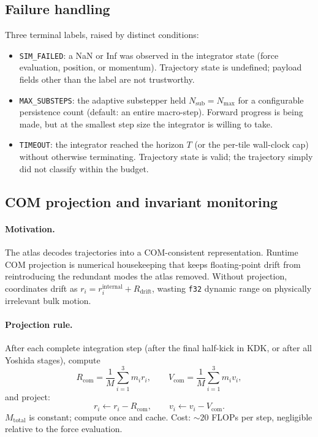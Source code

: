 \documentclass[11pt]{report}
\begin{document}
\subsection{Failure handling}

Three terminal labels, raised by distinct conditions:
\begin{itemize}[nosep]
\item \texttt{SIM\_FAILED}: a NaN or Inf was observed in the integrator state (force evaluation, position, or momentum). Trajectory state is undefined; payload fields other than the label are not trustworthy.
\item \texttt{MAX\_SUBSTEPS}: the adaptive substepper held $N_{\mathrm{sub}}=N_{\max}$ for a configurable persistence count (default: an entire macro-step). Forward progress is being made, but at the smallest step size the integrator is willing to take.
\item \texttt{TIMEOUT}: the integrator reached the horizon $T$ (or the per-tile wall-clock cap) without otherwise terminating. Trajectory state is valid; the trajectory simply did not classify within the budget.
\end{itemize}

\subsection{COM projection and invariant monitoring}
\label{sec:com_projection}

\paragraph{Motivation.} The atlas decodes trajectories into a COM-consistent representation. Runtime COM projection is numerical housekeeping that keeps floating-point drift from reintroducing the redundant modes the atlas removed. Without projection, coordinates drift as $r_i = r_i^{\text{internal}} + R_{\text{drift}}$, wasting \texttt{f32} dynamic range on physically irrelevant bulk motion.

\paragraph{Projection rule.} After each complete integration step (after the final half-kick in KDK, or after all Yoshida stages), compute
\[
R_{\text{com}} = \frac{1}{M}\sum_{i=1}^{3} m_i r_i, \qquad V_{\text{com}} = \frac{1}{M}\sum_{i=1}^{3} m_i v_i,
\]
and project:
\[
r_i \leftarrow r_i - R_{\text{com}}, \qquad v_i \leftarrow v_i - V_{\text{com}}.
\]
$M_{\text{total}}$ is constant; compute once and cache. Cost: $\sim 20$ FLOPs per step, negligible relative to the force evaluation.
\end{document}
